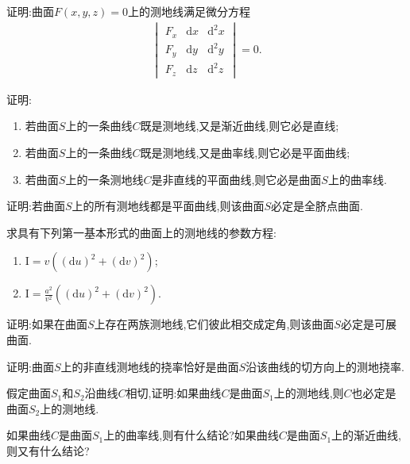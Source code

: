 \documentclass[../../main.tex]{subfiles}%
\begin{document}
\begin{example}
证明:曲面$F(x,y,z)=0$上的测地线满足微分方程
\begin{align*}
\begin{vmatrix}
F_x & \mathrm{d}x & \mathrm{d}^2x \\
F_y & \mathrm{d}y & \mathrm{d}^2y \\
F_z & \mathrm{d}z & \mathrm{d}^2z
\end{vmatrix}=0.
\end{align*}
\end{example}

\begin{example}
证明:
\begin{enumerate}[(1)]
\item 若曲面$S$上的一条曲线$C$既是测地线,又是渐近曲线,则它必是直线;
\item 若曲面$S$上的一条曲线$C$既是测地线,又是曲率线,则它必是平面曲线;
\item 若曲面$S$上的一条测地线$C$是非直线的平面曲线,则它必是曲面$S$上的曲率线.
\end{enumerate}
\end{example}

\begin{example}
证明:若曲面$S$上的所有测地线都是平面曲线,则该曲面$S$必定是全脐点曲面.
\end{example}

\begin{example}
求具有下列第一基本形式的曲面上的测地线的参数方程:
\begin{enumerate}[(1)]
\item $\mathrm{I}=v\left((\mathrm{d}u)^2+(\mathrm{d}v)^2\right)$;
\item $\mathrm{I}=\frac{a^2}{v^2}\left((\mathrm{d}u)^2+(\mathrm{d}v)^2\right)$.
\end{enumerate}
\end{example}

\begin{example}
证明:如果在曲面$S$上存在两族测地线,它们彼此相交成定角,则该曲面$S$必定是可展曲面.
\end{example}

\begin{example}
证明:曲面$S$上的非直线测地线的挠率恰好是曲面$S$沿该曲线的切方向上的测地挠率.
\end{example}

\begin{example}
假定曲面$S_1$和$S_2$沿曲线$C$相切,证明:如果曲线$C$是曲面$S_1$上的测地线,则$C$也必定是曲面$S_2$上的测地线.

如果曲线$C$是曲面$S_1$上的曲率线,则有什么结论?如果曲线$C$是曲面$S_1$上的渐近曲线,则又有什么结论?
\end{example}
\end{document}
